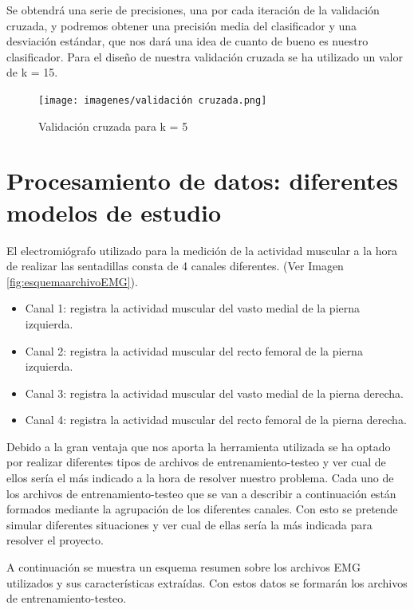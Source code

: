     Se obtendrá una serie de precisiones, una por cada iteración de la validación cruzada, y podremos obtener una precisión media del clasificador y una desviación estándar, que nos dará una idea de cuanto de bueno es nuestro clasificador. Para el diseño de nuestra validación cruzada se ha utilizado un valor de k = 15.
    
    \begin{figure}[ht]
    \texttt{[image: imagenes/validación cruzada.png]}
    \caption{ Validación cruzada para k = 5  }
    \label{fig:validacioncruzada}
    \end{figure}
    
    
\section{Procesamiento de datos: diferentes modelos de estudio} \label{tiposClasificadores}
El electromiógrafo utilizado para la medición de la actividad muscular a la hora de realizar las sentadillas consta de 4 canales diferentes. (Ver Imagen \ref{fig:esquemaarchivoEMG}).
\begin{itemize}
\item Canal 1: registra la actividad muscular del vasto medial de la pierna izquierda.
\item Canal 2: registra la actividad muscular del recto femoral de la pierna izquierda.
\item Canal 3: registra la actividad muscular del vasto medial de la pierna derecha.
\item Canal 4: registra la actividad muscular del recto femoral de la pierna derecha.
\end{itemize}
Debido a la gran ventaja que nos aporta la herramienta utilizada se ha optado por realizar diferentes tipos de archivos de entrenamiento-testeo y ver cual de ellos sería el más indicado a la hora de resolver nuestro problema. Cada uno de los archivos de entrenamiento-testeo que se van a describir a continuación están formados mediante la agrupación de los diferentes canales. Con esto se pretende simular diferentes situaciones y ver cual de ellas sería la más indicada para resolver el proyecto.



A continuación se muestra un esquema resumen sobre los archivos EMG utilizados y sus características extraídas. Con estos datos se formarán los archivos de entrenamiento-testeo.


